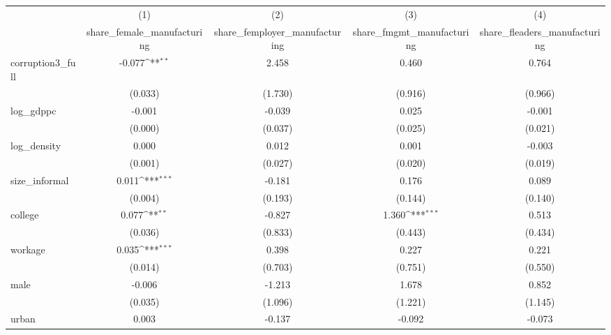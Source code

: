 {
\def\sym#1{\ifmmode^{#1}\else\(^{#1}\)\fi}
\begin{tabular}{l*{4}{c}}
\hline\hline
            &\multicolumn{1}{c}{(1)}&\multicolumn{1}{c}{(2)}&\multicolumn{1}{c}{(3)}&\multicolumn{1}{c}{(4)}\\
            &\multicolumn{1}{c}{share\_female\_manufacturing}&\multicolumn{1}{c}{share\_femployer\_manufacturing}&\multicolumn{1}{c}{share\_fmgmt\_manufacturing}&\multicolumn{1}{c}{share\_fleaders\_manufacturing}\\
\hline
corruption3\_full&      -0.077\sym{**} &       2.458         &       0.460         &       0.764         \\
            &     (0.033)         &     (1.730)         &     (0.916)         &     (0.966)         \\
[1em]
log\_gdppc   &      -0.001         &      -0.039         &       0.025         &      -0.001         \\
            &     (0.000)         &     (0.037)         &     (0.025)         &     (0.021)         \\
[1em]
log\_density &       0.000         &       0.012         &       0.001         &      -0.003         \\
            &     (0.001)         &     (0.027)         &     (0.020)         &     (0.019)         \\
[1em]
size\_informal&       0.011\sym{***}&      -0.181         &       0.176         &       0.089         \\
            &     (0.004)         &     (0.193)         &     (0.144)         &     (0.140)         \\
[1em]
college     &       0.077\sym{**} &      -0.827         &       1.360\sym{***}&       0.513         \\
            &     (0.036)         &     (0.833)         &     (0.443)         &     (0.434)         \\
[1em]
workage     &       0.035\sym{***}&       0.398         &       0.227         &       0.221         \\
            &     (0.014)         &     (0.703)         &     (0.751)         &     (0.550)         \\
[1em]
male        &      -0.006         &      -1.213         &       1.678         &       0.852         \\
            &     (0.035)         &     (1.096)         &     (1.221)         &     (1.145)         \\
[1em]
urban       &       0.003         &      -0.137         &      -0.092         &      -0.073         \\

\end{tabular}}
